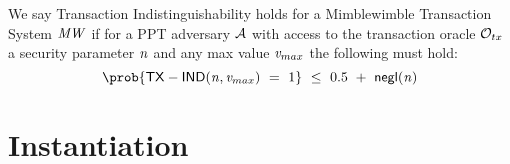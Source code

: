 \begin{center}
\end{center}

\begin{definition} \label{def:atom:tx-indisting}
    We say Transaction Indistinguishability holds for a Mimblewimble Transaction System $\mathit{MW}$ if for a PPT adversary $\mathcal{A}$ with access to the transaction oracle $\mathcal{O}_{tx}$ a
    security parameter $\mathit{n}$ and any max value $\mathit{v}_{max}$ the following must hold:
    \[ \prob{\procTxInd{\varN}{\varValueMax} \opEqNoQ 1} \opSmEq 0.5 \opAddScalar \funNegl{\varN} \]
\end{definition}


\section{Instantiation}\label{sec:atom:atomic-inst}

